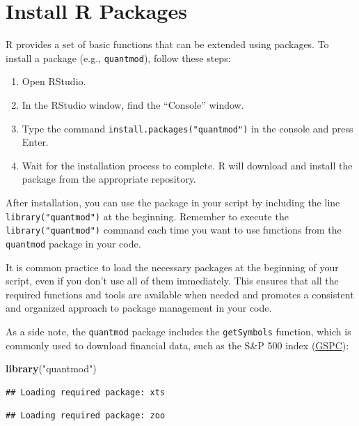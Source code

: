 \documentclass[
]{book}
\newenvironment{Shaded}{\begin{snugshade}}{\end{snugshade}}
\newcommand{\FunctionTok}[1]{\textcolor[rgb]{0.13,0.29,0.53}{\textbf{#1}}}
\newcommand{\NormalTok}[1]{#1}
\newcommand{\StringTok}[1]{\textcolor[rgb]{0.31,0.60,0.02}{#1}}
\providecommand{\tightlist}{%
  \setlength{\itemsep}{0pt}\setlength{\parskip}{0pt}}
\begin{document}
\hypertarget{install-r-packages}{%
\section{Install R Packages}\label{install-r-packages}}

R provides a set of basic functions that can be extended using packages. To install a package (e.g., \texttt{quantmod}), follow these steps:

\begin{enumerate}
\def\labelenumi{\arabic{enumi}.}
\tightlist
\item
  Open RStudio.
\item
  In the RStudio window, find the ``Console'' window.
\item
  Type the command \texttt{install.packages("quantmod")} in the console and press Enter.
\item
  Wait for the installation process to complete. R will download and install the package from the appropriate repository.
\end{enumerate}

After installation, you can use the package in your script by including the line \texttt{library("quantmod")} at the beginning. Remember to execute the \texttt{library("quantmod")} command each time you want to use functions from the \texttt{quantmod} package in your code.

It is common practice to load the necessary packages at the beginning of your script, even if you don't use all of them immediately. This ensures that all the required functions and tools are available when needed and promotes a consistent and organized approach to package management in your code.

As a side note, the \texttt{quantmod} package includes the \texttt{getSymbols} function, which is commonly used to download financial data, such as the S\&P 500 index (\href{https://finance.yahoo.com/quote/\%5EGSPC/}{GSPC}):

\begin{Shaded}
\begin{Highlighting}[]
\FunctionTok{library}\NormalTok{(}\StringTok{"quantmod"}\NormalTok{)}
\end{Highlighting}
\end{Shaded}

\begin{verbatim}
## Loading required package: xts
\end{verbatim}

\begin{verbatim}
## Loading required package: zoo
\end{verbatim}
\end{document}
